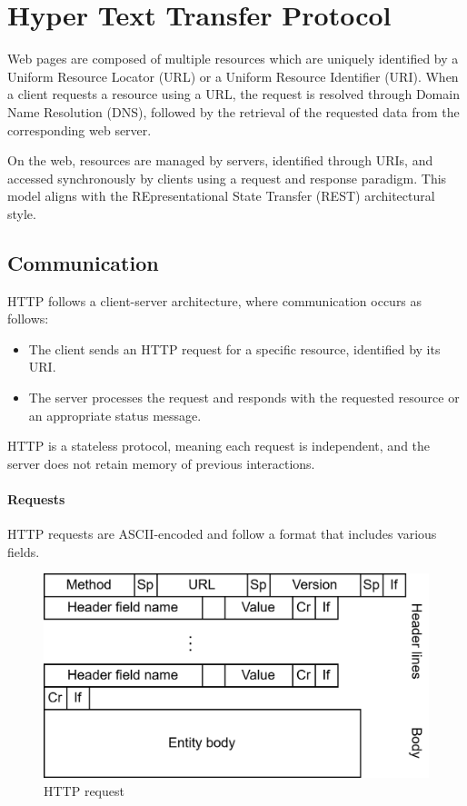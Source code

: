 \section{Hyper Text Transfer Protocol}

Web pages are composed of multiple resources which are uniquely identified by a Uniform Resource Locator (URL) or a Uniform Resource Identifier (URI).
When a client requests a resource using a URL, the request is resolved through Domain Name Resolution (DNS), followed by the retrieval of the requested data from the corresponding web server.

On the web, resources are managed by servers, identified through URIs, and accessed synchronously by clients using a request and response paradigm.
This model aligns with the REpresentational State Transfer (REST) architectural style.

\subsection{Communication}
HTTP follows a client-server architecture, where communication occurs as follows:
\begin{itemize}
    \item The client sends an HTTP request for a specific resource, identified by its URI.
    \item The server processes the request and responds with the requested resource or an appropriate status message.
\end{itemize}
\noindent HTTP is a stateless protocol, meaning each request is independent, and the server does not retain memory of previous interactions. 

\paragraph*{Requests}
HTTP requests are ASCII-encoded and follow a format that includes various fields.
\begin{figure}[H]
    \centering
    \includegraphics[width=0.5\linewidth]{images/iot7.png}
    \caption{HTTP request}
\end{figure}

